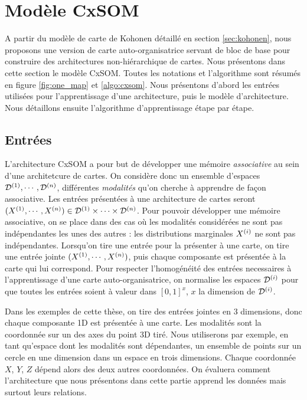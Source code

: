\section{Modèle CxSOM}
A partir du modèle de carte de Kohonen détaillé en section \ref{sec:kohonen}, nous proposons une version de carte auto-organisatrice servant de bloc de base pour construire des architectures non-hiérarchique de cartes. Nous présentons dans cette section le modèle CxSOM. Toutes les notations et l'algorithme sont résumés en figure \ref{fig:one_map} et \ref{algo:cxsom}. Nous présentons d'abord les entrées utilisées pour l'apprentissage d'une architecture, puis le modèle d'architecture. Nous détaillons ensuite l'algorithme d'apprentissage étape par étape. 

\subsection{Entrées}
L'architecture CxSOM a pour but de développer une mémoire \emph{associative} au sein d'une architetcure de cartes. On considère donc un ensemble d'espaces $\mathcal{D}^{({1})}, \cdots , \mathcal{D}^{({n})}$, différentes \emph{modalités} qu'on cherche à apprendre de façon associative. Les entrées présentées à une architecture de cartes seront $(X^{({1})}, \cdots, X^{({n})}) \in \mathcal{D}^{({1})} \times \cdots \times \mathcal{D}^{({n})}$. Pour pouvoir développer une mémoire associative, on se place dans des cas où les modalités considérées ne sont pas indépendantes les unes des autres : les distributions marginales $X^{({i})}$ ne sont pas indépendantes. Lorsqu'on tire une entrée pour la présenter à une carte, on tire une entrée jointe $(X^{({1})}, \cdots , X^{({n})})$, puis chaque composante est présentée à la carte qui lui correspond. Pour respecter l'homogénéité des entrées necessaires à l'apprentissage d'une carte auto-organisatrice, on normalise les espaces $\mathcal{D}^{({i})}$ pour que toutes les entrées soient à valeur dans $[0,1]^x$, $x$ la dimension de $\mathcal{D}^{({i})}$.

Dans les exemples de cette thèse, on tire des entrées jointes en 3 dimensions, donc chaque composante 1D est présentée à une carte. Les modalités sont la coordonnée sur un des axes du point 3D tiré. Nous utiliserons par exemple, en tant qu'espace dont les modalités sont dépendantes, un ensemble de points sur un cercle en une dimension dans un espace en trois dimensions. Chaque coordonnée $X$, $Y$, $Z$ dépend alors des deux autres coordonnées. On évaluera comment l'architecture que nous présentons dans cette partie apprend les données mais surtout leurs relations. 


